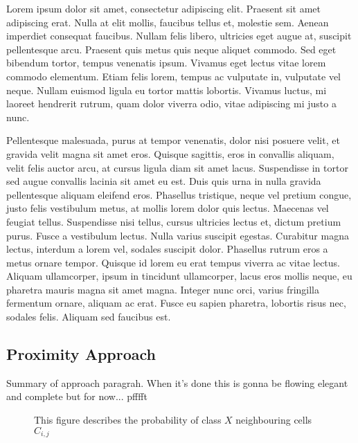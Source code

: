 \documentclass[preprint,5p,times,twocolumn]{elsarticle}
\begin{document}
Lorem ipsum dolor sit amet, consectetur adipiscing elit. Praesent sit amet
adipiscing erat. Nulla at elit mollis, faucibus tellus et, molestie sem. Aenean
imperdiet consequat faucibus. Nullam felis libero, ultricies eget augue at,
suscipit pellentesque arcu. Praesent quis metus quis neque aliquet commodo. Sed
eget bibendum tortor, tempus venenatis ipsum. Vivamus eget lectus vitae lorem
commodo elementum. Etiam felis lorem, tempus ac vulputate in, vulputate vel
neque. Nullam euismod ligula eu tortor mattis lobortis. Vivamus luctus, mi
laoreet hendrerit rutrum, quam dolor viverra odio, vitae adipiscing mi justo a
nunc.

Pellentesque malesuada, purus at tempor venenatis, dolor nisi posuere velit, et
gravida velit magna sit amet eros. Quisque sagittis, eros in convallis aliquam,
velit felis auctor arcu, at cursus ligula diam sit amet lacus. Suspendisse in
tortor sed augue convallis lacinia sit amet eu est. Duis quis urna in nulla
gravida pellentesque aliquam eleifend eros. Phasellus tristique, neque vel
pretium congue, justo felis vestibulum metus, at mollis lorem dolor quis
lectus. Maecenas vel feugiat tellus. Suspendisse nisi tellus, cursus ultricies
lectus et, dictum pretium purus. Fusce a vestibulum lectus. Nulla varius
suscipit egestas. Curabitur magna lectus, interdum a lorem vel, sodales
suscipit dolor. Phasellus rutrum eros a metus ornare tempor. Quisque id lorem
eu erat tempus viverra ac vitae lectus. Aliquam ullamcorper, ipsum in tincidunt
ullamcorper, lacus eros mollis neque, eu pharetra mauris magna sit amet magna.
Integer nunc orci, varius fringilla fermentum ornare, aliquam ac erat. Fusce eu
sapien pharetra, lobortis risus nec, sodales felis. Aliquam sed faucibus est.

\subsection{Proximity Approach}
\label{process:proximity}

Summary of approach paragrah. When it's done this is gonna be flowing elegant
and complete but for now... pfffft %

\begin{figure}[h]
\begin{center}
\end{center}
\caption{This figure describes the probability of class $X$ neighbouring cells $C_{i,j}$}
\end{figure}
\end{document}
